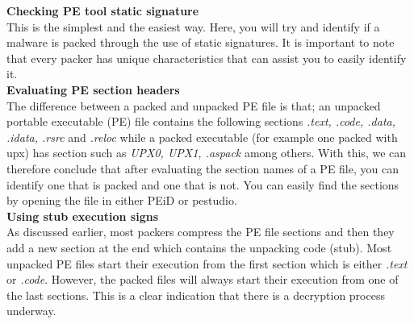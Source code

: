 \textbf{Checking PE tool static signature}\\
This is the simplest and the easiest way. Here, you will try and identify if a malware is packed through the use of static signatures. It is important to note that every packer has unique characteristics that can assist you to easily identify it.\\

\textbf{Evaluating PE section headers}\\
The difference between a packed and unpacked PE file is that; an unpacked portable executable (PE) file contains the following sections \textit{.text, .code, .data, .idata, .rsrc} and \textit{.reloc} while a packed executable (for example one packed with upx) has section such as \textit{UPX0, UPX1, .aspack} among others.
With this, we can therefore conclude that after evaluating the section names of a PE file, you can identify one that is packed and one that is not. You can easily find the sections by opening the file in either PEiD or pestudio.\\

\textbf{Using stub execution signs}\\
As discussed earlier, most packers compress the PE file sections and then they add a new section at the end which contains the unpacking code (stub). Most unpacked PE files start their execution from the first section which is either \textit{.text} or \textit{.code}. However, the packed files will always start their execution from one of the last sections. This is a clear indication that there is a decryption process underway.